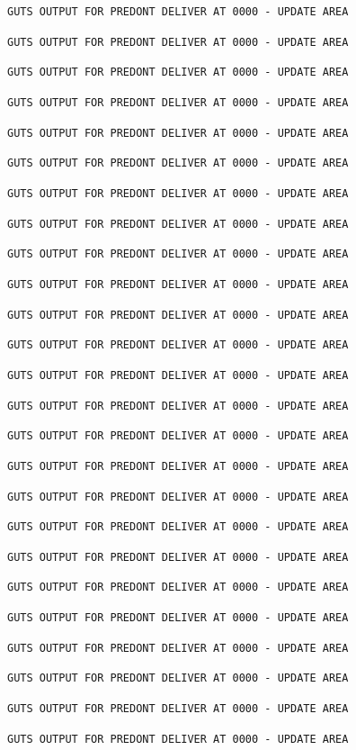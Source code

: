 \texttt{GUTS OUTPUT FOR PREDONT DELIVER AT 0000 - UPDATE AREA}

\texttt{GUTS OUTPUT FOR PREDONT DELIVER AT 0000 - UPDATE AREA}

\texttt{GUTS OUTPUT FOR PREDONT DELIVER AT 0000 - UPDATE AREA}

\texttt{GUTS OUTPUT FOR PREDONT DELIVER AT 0000 - UPDATE AREA}

\texttt{GUTS OUTPUT FOR PREDONT DELIVER AT 0000 - UPDATE AREA}

\texttt{GUTS OUTPUT FOR PREDONT DELIVER AT 0000 - UPDATE AREA}

\texttt{GUTS OUTPUT FOR PREDONT DELIVER AT 0000 - UPDATE AREA}

\texttt{GUTS OUTPUT FOR PREDONT DELIVER AT 0000 - UPDATE AREA}

\texttt{GUTS OUTPUT FOR PREDONT DELIVER AT 0000 - UPDATE AREA}

\texttt{GUTS OUTPUT FOR PREDONT DELIVER AT 0000 - UPDATE AREA}

\texttt{GUTS OUTPUT FOR PREDONT DELIVER AT 0000 - UPDATE AREA}

\texttt{GUTS OUTPUT FOR PREDONT DELIVER AT 0000 - UPDATE AREA}

\texttt{GUTS OUTPUT FOR PREDONT DELIVER AT 0000 - UPDATE AREA}

\texttt{GUTS OUTPUT FOR PREDONT DELIVER AT 0000 - UPDATE AREA}

\texttt{GUTS OUTPUT FOR PREDONT DELIVER AT 0000 - UPDATE AREA}

\texttt{GUTS OUTPUT FOR PREDONT DELIVER AT 0000 - UPDATE AREA}

\texttt{GUTS OUTPUT FOR PREDONT DELIVER AT 0000 - UPDATE AREA}

\texttt{GUTS OUTPUT FOR PREDONT DELIVER AT 0000 - UPDATE AREA}

\texttt{GUTS OUTPUT FOR PREDONT DELIVER AT 0000 - UPDATE AREA}

\texttt{GUTS OUTPUT FOR PREDONT DELIVER AT 0000 - UPDATE AREA}

\texttt{GUTS OUTPUT FOR PREDONT DELIVER AT 0000 - UPDATE AREA}

\texttt{GUTS OUTPUT FOR PREDONT DELIVER AT 0000 - UPDATE AREA}

\texttt{GUTS OUTPUT FOR PREDONT DELIVER AT 0000 - UPDATE AREA}

\texttt{GUTS OUTPUT FOR PREDONT DELIVER AT 0000 - UPDATE AREA}

\texttt{GUTS OUTPUT FOR PREDONT DELIVER AT 0000 - UPDATE AREA}

